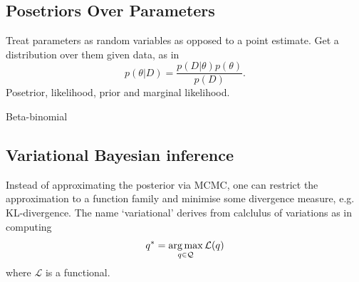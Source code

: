 \documentclass[11pt]{article}
\begin{document}
\begin{appendices}
\subsection{Posetriors Over Parameters}
Treat parameters as random variables as opposed to a point estimate. Get a distribution over them given data, as in
$$
p(\theta|D)
=
\frac{p(D|\theta)p(\theta)}{p(D)}.
$$
Posetrior, likelihood, prior and marginal likelihood.

\begin{example}
    Beta-binomial
\end{example}

\subsection{Variational Bayesian inference}
Instead of approximating the posterior via MCMC, one can restrict the approximation to a function family and minimise some divergence measure, e.g. KL-divergence. The name `variational' derives from calclulus of variations as in computing
$$
q^*
=
\operatorname*{arg\,max}_{q\in\mathcal{Q}}\mathcal{L}(q)
$$
where $\mathcal{L}$ is a functional.





\end{appendices}
\end{document}

